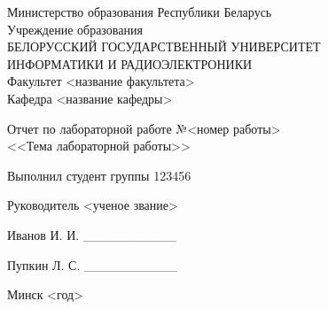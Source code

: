 \thispagestyle{empty}
\setlength{\parindent}{0ex} %

\begin{center}
  Министерство образования Республики Беларусь \\
  \vspace{0.5ex}
  Учреждение образования \\
  БЕЛОРУССКИЙ ГОСУДАРСТВЕННЫЙ УНИВЕРСИТЕТ \\
  ИНФОРМАТИКИ И РАДИОЭЛЕКТРОНИКИ \\
  \vspace{0.5ex}
  Факультет <название факультета> \\
  \vspace{0.5ex}
  Кафедра <название кафедры>
\end{center}

\vspace{50mm}

\begin{center}
  Отчет по лабораторной работе №<номер работы> \\
  <<Тема лабораторной работы>>
\end{center}

\vspace{50mm}

\begin{minipage}{.55\linewidth}
    Выполнил студент группы 123456 

    \smallskip

    Руководитель <ученое звание>
\end{minipage}
\hfill
\begin{minipage}{.4\linewidth}
  \begin{flushright}
    Иванов И. И. \_\_\_\_\_\_\_\_\_\_

    \smallskip

    Пупкин Л. С. \_\_\_\_\_\_\_\_\_\_
  \end{flushright}
\end{minipage}

\vspace{60mm}
\begin{center}
  Минск <год>
\end{center}

\setlength{\parindent}{1.25cm} %

\newpage
